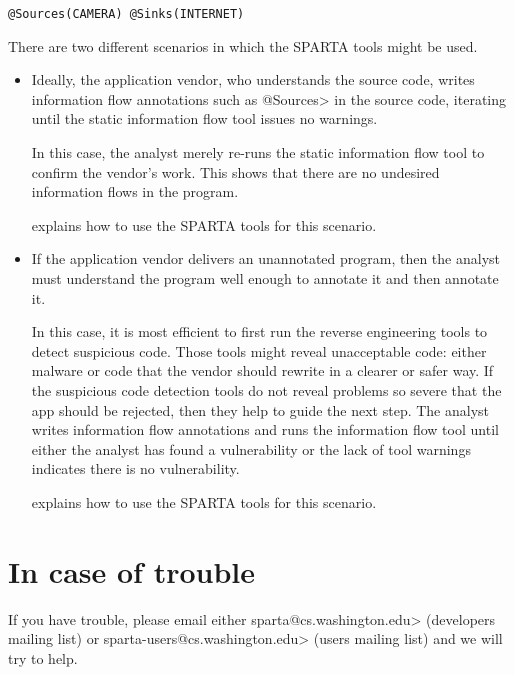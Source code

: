 \begin{Verbatim}
@Sources(CAMERA) @Sinks(INTERNET)
\end{Verbatim}



There are two different scenarios in which the SPARTA tools might be used.

\begin{itemize}
\item
  Ideally, the application vendor, who understands the source code,
  writes information flow annotations such as \<@Sources> in the source
  code, iterating until the static information flow tool issues no warnings.

  In this case, the analyst merely re-runs the static information flow tool
  to confirm the vendor's work.  This shows that there are no undesired
  information flows in the program.

   explains how to use the SPARTA tools for
  this scenario.

\item
  If the application vendor delivers an unannotated program, then the
  analyst must understand the program well enough to annotate it and then
  annotate it.

  In this case, it is most efficient to first run the reverse engineering
  tools to detect suspicious code.  Those tools might reveal unacceptable
  code: either malware or code that the vendor
  should rewrite in a clearer or safer way.  If the suspicious code
  detection tools do not reveal problems so severe that the app should be
  rejected, then they help to guide the next step.   The analyst writes
  information flow annotations and runs the information
  flow tool until either the analyst has found a vulnerability or the lack
  of tool warnings indicates there is no vulnerability.

   explains how to use the SPARTA tools for
  this scenario.
\end{itemize}


\section{In case of trouble\label{sec:incaseoftrouble}}

\begin{sloppypar}
If you have trouble, please email either
\<sparta@cs.washington.edu>
(developers mailing list) or
\<sparta-users@cs.washington.edu> (users
mailing list) and we will try to help.
\end{sloppypar}





